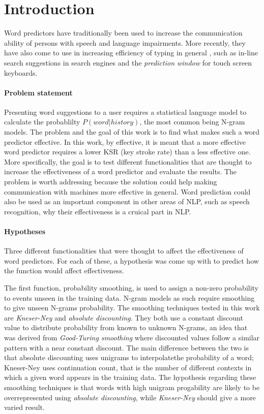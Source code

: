 \section{Introduction}
Word predictors have traditionally been used to increase the communication ability of persons with speech and language impairments\cite{Lesher99effectsof}\cite{keystrokes}\cite{corpus}. More recently, they have also come to use in increasing efficiency of typing in general \cite{Lesher99effectsof}, such as in-line search suggestions in search engines and the \emph{prediction window} for touch screen keyboards. 

\paragraph{Problem statement}
Presenting word suggestions to a user requires a statistical language model\cite{keystrokes} to calculate the probablilty $P(word|history)$, the most common being N-gram models\cite{Wandmacher}. The problem and the goal of this work is to find what makes such a word predictor effective. In this work, by effective, it is meant that a more effective word predictor requires a lower KSR (key stroke rate) than a less effective one. More specifically, the goal is to test different functionalities that are thought to increase the effectiveness of a word predictor and evaluate the results. The problem is worth addressing because the solution could help making communication with machines more effective in general. Word prediction could also be used as an important component in other areas of NLP, such as speech recognition, why their effectiveness is a cruical part in NLP.

\paragraph{Hypotheses}
Three different functionalities that were thought to affect the effectiveness of word predictors. For each of these, a hypothesis was come up with to predict how the function would affect effectiveness.

The first function, probability smoothing, is used to assign a non-zero probability to events unseen in the training data\cite{smoothing}. N-gram models as such require smoothing to give unseen N-grams probability\cite{Russel}. The smoothing techniques tested in this work are \emph{Kneser-Ney} and \emph{absolute discounting}. They both use a constant discount value to distribute probability from known to unknown N-grams, an idea that was derived from \emph{Good-Turing smoothing} where discounted values follow a similar pattern with a near constant discount\cite{coursera}. The main difference between the two is that absolute discounting uses unigrams to interpolatethe probability of a word; Kneser-Ney uses continuation count, that is the number of different contexts in which a given word appears in the training data\cite{coursera}. The hypothesis regarding these smoothing techniques is that words with high unigram progability are likely to be overrepresented using \emph{absolute discounting}, while \emph{Kneser-Ney} should give a more varied result.


